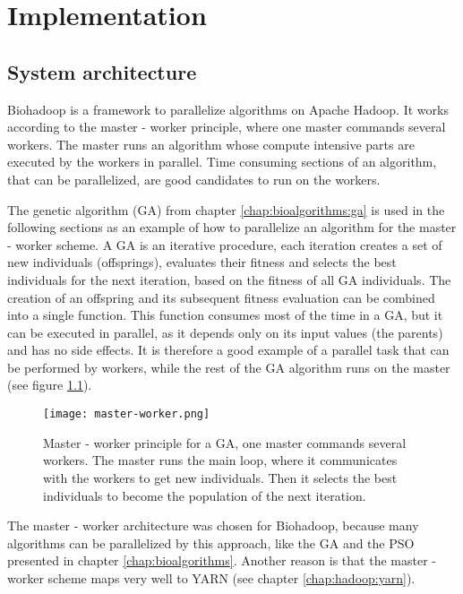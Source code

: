\chapter{Implementation}
\label{chap:impl}

\section{System architecture}
\label{chap:impl:system-architecture}
Biohadoop is a framework to parallelize algorithms on Apache Hadoop. It works according to the master - worker principle, where one master commands several workers. The master runs an algorithm whose compute intensive parts are executed by the workers in parallel. Time consuming sections of an algorithm, that can be parallelized, are good candidates to run on the workers.

The genetic algorithm (GA) from chapter \ref{chap:bioalgorithms:ga} is used in the following sections as an example of how to parallelize an algorithm for the master - worker scheme. A GA is an iterative procedure, each iteration creates a set of new individuals (offsprings), evaluates their fitness and selects the best individuals for the next iteration, based on the fitness of all GA individuals. The creation of an offspring and its subsequent fitness evaluation can be combined into a single function. This function consumes most of the time in a GA, but it can be executed in parallel, as it depends only on its input values (the parents) and has no side effects. It is therefore a good example of a parallel task that can be performed by workers, while the rest of the GA algorithm runs on the master (see figure \ref{fig:master-worker}).

\begin{figure}[ht!]
  \centering
  \texttt{[image: master-worker.png]}
  \caption{Master - worker principle for a GA, one master commands several workers. The master runs the main loop, where it communicates with the workers to get new individuals. Then it selects the best individuals to become the population of the next iteration.}
  \label{fig:master-worker}
\end{figure}

The master - worker architecture was chosen for Biohadoop, because many algorithms can be parallelized by this approach, like the GA and the PSO presented in chapter \ref{chap:bioalgorithms}. Another reason is that the master - worker scheme maps very well to YARN (see chapter \ref{chap:hadoop:yarn}).

